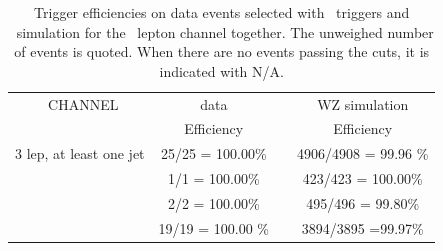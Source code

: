\begin{table}[htbp]
	\centering
	\caption{Trigger efficiencies on data events selected with \Etmis\ triggers and \WZ\ simulation for the \emumu\ lepton channel together. The unweighed number of events is quoted. When there are no events passing the cuts, it is indicated with N/A.}

	\begin{tabular}{cccc}
		\toprule 
		\emumu\ CHANNEL & {data} & &{WZ simulation} \\ 
		& Efficiency &  & Efficiency \\
		\midrule
		3 lep,  at least one jet & 25/25 = 100.00\%  & & 4906/4908 = 99.96 \%   \\ 
		\STSR & 1/1 = 100.00\% & & 423/423 = 100.00\%  \\ 
		\TTSR & 2/2 = 100.00\% &  & 495/496 = 99.80\% \\ 
		\WZCR & 19/19 = 100.00 \% &  & 3894/3895 =99.97\%  \\ 
		\bottomrule 
	\end{tabular} 
	\label{tab:trigSF}
\end{table}
